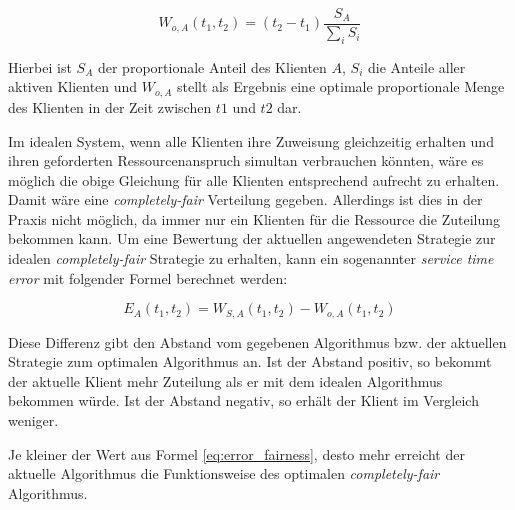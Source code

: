 \begin{equation}
W_{o,A}(t_1,t_2) = (t_2-t_1) \frac{S_A}{\sum_i S_i}
\label{eq:perfect_fairness}
\end{equation}

Hierbei ist $S_A$ der proportionale Anteil des Klienten $A$, $S_i$ die Anteile aller aktiven Klienten und $W_{o,A}$ stellt als Ergebnis eine optimale proportionale Menge des Klienten in der Zeit zwischen $t1$ und $t2$ dar.

Im idealen System, wenn alle Klienten ihre Zuweisung gleichzeitig erhalten und ihren geforderten Ressourcenanspruch simultan verbrauchen könnten, wäre es möglich die obige Gleichung für alle Klienten entsprechend aufrecht zu erhalten.
Damit wäre eine \textit{completely-fair} Verteilung gegeben. Allerdings ist dies in der Praxis nicht möglich, da immer nur ein Klienten für die Ressource die Zuteilung bekommen kann.
Um eine Bewertung der aktuellen angewendeten Strategie zur idealen \textit{completely-fair} Strategie zu erhalten, kann ein sogenannter \textit{service time error} mit folgender Formel berechnet werden:

\begin{equation}
E_A(t_1,t_2) = W_{S,A}(t_1,t_2)-W_{o,A}(t_1,t_2)
\label{eq:error_fairness}
\end{equation}

Diese Differenz gibt den Abstand vom gegebenen Algorithmus bzw. der aktuellen Strategie zum optimalen Algorithmus an.
Ist der Abstand positiv, so bekommt der aktuelle Klient mehr Zuteilung als er mit dem idealen Algorithmus bekommen würde. Ist der Abstand negativ, so erhält der Klient im Vergleich weniger.

Je kleiner der Wert aus Formel \ref{eq:error_fairness}, desto mehr erreicht der aktuelle Algorithmus die Funktionsweise des optimalen \textit{completely-fair} Algorithmus.
 



